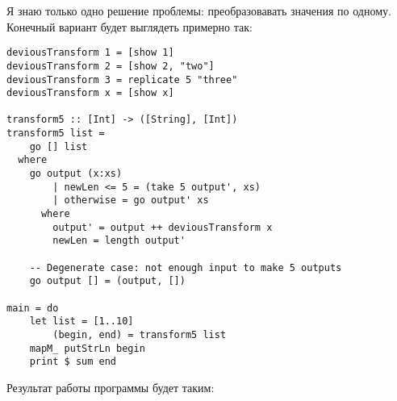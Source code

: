Я знаю только одно решение проблемы: преобразовавать значения по одному. Конечный вариант будет выглядеть примерно так:
\begin{lstlisting}
deviousTransform 1 = [show 1]
deviousTransform 2 = [show 2, "two"]
deviousTransform 3 = replicate 5 "three"
deviousTransform x = [show x]

transform5 :: [Int] -> ([String], [Int])
transform5 list =
    go [] list
  where
    go output (x:xs)
        | newLen <= 5 = (take 5 output', xs)
        | otherwise = go output' xs
      where
        output' = output ++ deviousTransform x
        newLen = length output'

    -- Degenerate case: not enough input to make 5 outputs
    go output [] = (output, [])

main = do
    let list = [1..10]
        (begin, end) = transform5 list
    mapM_ putStrLn begin
    print $ sum end
\end{lstlisting}    
Результат работы программы будет таким:
